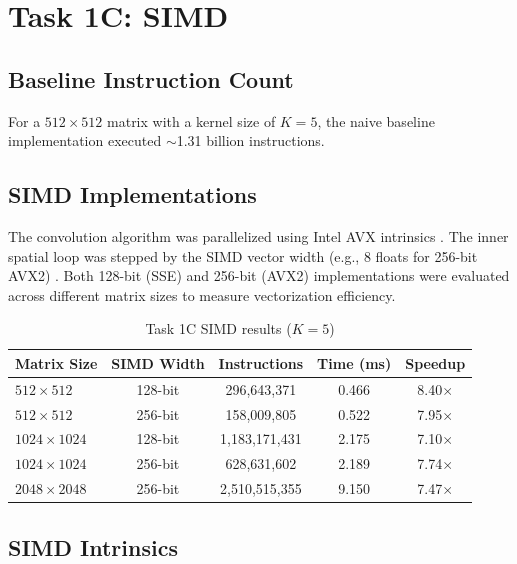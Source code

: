 
\section{Task 1C: SIMD}

\subsection{Baseline Instruction Count}
For a $512 \times 512$ matrix with a kernel size of $K=5$, the naive baseline implementation executed $\sim$1.31 billion instructions.

\subsection{SIMD Implementations}
The convolution algorithm was parallelized using Intel AVX intrinsics . The inner spatial loop was stepped by the SIMD vector width (e.g., 8 floats for 256-bit AVX2) . Both 128-bit (SSE) and 256-bit (AVX2) implementations were evaluated across different matrix sizes to measure vectorization efficiency.

\begin{table}[H]
\centering
\caption{Task 1C SIMD results ($K=5$)}
\begin{tabular}{lcccc}
\toprule
Matrix Size & SIMD Width & Instructions & Time (ms) & Speedup \\
\midrule
$512 \times 512$   & 128-bit & 296,643,371   & 0.466 & 8.40$\times$ \\
$512 \times 512$   & 256-bit & 158,009,805   & 0.522 & 7.95$\times$ \\
$1024 \times 1024$ & 128-bit & 1,183,171,431 & 2.175 & 7.10$\times$ \\
$1024 \times 1024$ & 256-bit & 628,631,602   & 2.189 & 7.74$\times$ \\
$2048 \times 2048$ & 256-bit & 2,510,515,355 & 9.150 & 7.47$\times$ \\
\bottomrule
\end{tabular}
\end{table}

\subsection{SIMD Intrinsics}


